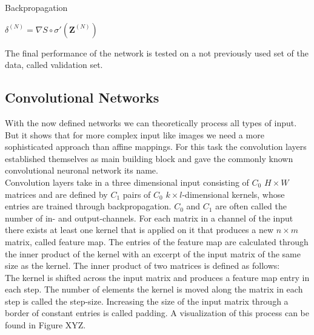 \documentclass[a4paper,12pt,titlepage,enabledeprecatedfontcommands]{scrreprt}
\begin{document}
\begin{algorithm}[H] \label{backprop}
\caption{Backpropagation}
  $\delta^{(N)} = \nabla S \circ \sigma'(\bm{Z}^{(N)})$ \\
\end{algorithm}
The final performance of the network is tested on a not previously used set of the data, called validation set. \\
\subsection{Convolutional Networks}
With the now defined networks we can theoretically process all types of input. But it shows that for more complex input like images we need a more sophisticated approach than affine mappings. For this task the convolution layers established themselves as main building block and gave the commonly known convolutional neuronal network its name. \\
Convolution layers take in a three dimensional input consisting of $C_0$ $H \times W$ matrices and are defined by $C_1$ pairs of $C_0$ $k \times l$-dimensional kernels, whose entries are trained through backpropagation. $C_0$ and $C_1$ are often called the number of in- and output-channels. For each matrix in a channel of the input there exists at least one kernel that is applied on it that produces a new $n \times m$ matrix, called feature map. The entries of the feature map are calculated through the inner product of the kernel with an excerpt of the input matrix of the same size as the kernel. The inner product of two matrices is defined as follows: \\

The kernel is shifted across the input matrix and produces a feature map entry in each step. The number of elements the kernel is moved along the matrix in each step is called the step-size. Increasing the size of the input matrix through a border of constant entries is called padding. A visualization of this process can be found in Figure XYZ. \\
 
\end{document}
